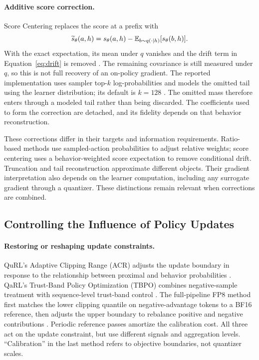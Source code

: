 \paragraph{Additive score correction.}
Score Centering replaces the score at a prefix with
\begin{equation}\label{eq:center}
\widetilde s_\theta(a,h)=s_\theta(a,h)-\mathbb{E}_{b\sim q(\cdot\mid h)}[s_\theta(b,h)].
\end{equation}
With the exact expectation, its mean under $q$ vanishes and the drift term in Equation~\eqref{eq:drift} is removed \citep{score}. The remaining covariance is still measured under $q$, so this is not full recovery of an on-policy gradient. The reported implementation uses sampler top-$k$ log-probabilities and models the omitted tail using the learner distribution; its default is $k=128$ \citep{score}. The omitted mass therefore enters through a modeled tail rather than being discarded. The coefficients used to form the correction are detached, and its fidelity depends on that behavior reconstruction.

These corrections differ in their targets and information requirements. Ratio-based methods use sampled-action probabilities to adjust relative weights; score centering uses a behavior-weighted score expectation to remove conditional drift. Truncation and tail reconstruction approximate different objects. Their gradient interpretation also depends on the learner computation, including any surrogate gradient through a quantizer. These distinctions remain relevant when corrections are combined.

\subsection{Controlling the Influence of Policy Updates}\label{sec:b2}
\paragraph{Restoring or reshaping update constraints.}
QuRL's Adaptive Clipping Range (ACR) adjusts the update boundary in response to the relationship between proximal and behavior probabilities \citep{qurl}. QaRL's Trust-Band Policy Optimization (TBPO) combines negative-sample treatment with sequence-level trust-band control \citep{qarl}. The full-pipeline FP8 method first matches the lower clipping quantile on negative-advantage tokens to a BF16 reference, then adjusts the upper boundary to rebalance positive and negative contributions \citep{fullfp8}. Periodic reference passes amortize the calibration cost. All three act on the update constraint, but use different signals and aggregation levels. ``Calibration'' in the last method refers to objective boundaries, not quantizer scales.


